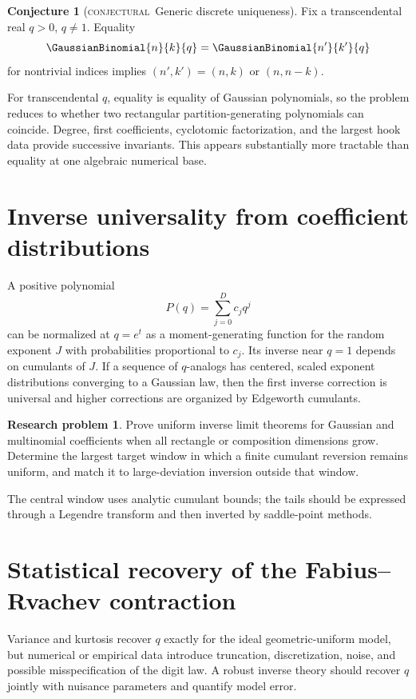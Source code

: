 \documentclass[11pt,letterpaper,oneside,openany]{book}
\theoremstyle{definition}
\newtheorem{researchproblem}[theorem]{Research problem}
\newtheorem{conjecture}[theorem]{Conjecture}
\theoremstyle{remark}
\newcommand{\statusconjectural}{\textcolor{conjectureorange}{\textsc{conjectural}}}
\begin{document}
\begin{conjecture}[\statusconjectural\ Generic discrete uniqueness]
Fix a transcendental real \(q>0\), \(q\ne1\).  Equality
\[
 \GaussianBinomial{n}{k}{q}=\GaussianBinomial{n'}{k'}{q}
\]
for nontrivial indices implies
\((n',k')=(n,k)\) or \((n,n-k)\).
\end{conjecture}
For transcendental \(q\), equality is equality of Gaussian polynomials, so the
problem reduces to whether two rectangular partition-generating polynomials
can coincide.  Degree, first coefficients, cyclotomic factorization, and the
largest hook data provide successive invariants.  This appears substantially
more tractable than equality at one algebraic numerical base.

\section{Inverse universality from coefficient distributions}
A positive polynomial
\[
 P(q)=\sum_{j=0}^{D}c_jq^j
\]
can be normalized at \(q=e^t\) as a moment-generating function for the random
exponent \(J\) with probabilities proportional to \(c_j\).  Its inverse near
\(q=1\) depends on cumulants of \(J\).  If a sequence of \(q\)-analogs has
centered, scaled exponent distributions converging to a Gaussian law, then the
first inverse correction is universal and higher corrections are organized by
Edgeworth cumulants.

\begin{researchproblem}
Prove uniform inverse limit theorems for Gaussian and multinomial coefficients
when all rectangle or composition dimensions grow.  Determine the largest
target window in which a finite cumulant reversion remains uniform, and match
it to large-deviation inversion outside that window.
\end{researchproblem}
The central window uses analytic cumulant bounds; the tails should be expressed
through a Legendre transform and then inverted by saddle-point methods.

\section{Statistical recovery of the Fabius--Rvachev contraction}
Variance and kurtosis recover \(q\) exactly for the ideal geometric-uniform
model, but numerical or empirical data introduce truncation, discretization,
noise, and possible misspecification of the digit law.  A robust inverse theory
should recover \(q\) jointly with nuisance parameters and quantify model error.
\end{document}
